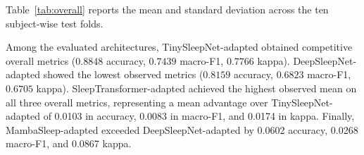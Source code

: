 \documentclass[conference]{IEEEtran}
\begin{document}
Table~\ref{tab:overall} reports the mean and standard deviation across the ten subject-wise test folds.

\begin{table}[H]
\centering
\caption{Architectures evaluated under the proposed unified framework.}
\label{tab:overall}
\setlength{\tabcolsep}{3.2pt}
\end{table}

Among the evaluated architectures, TinySleepNet-adapted obtained competitive overall metrics ($0.8848$ accuracy, $0.7439$ macro-F1, $0.7766$ kappa). DeepSleepNet-adapted showed the lowest observed metrics ($0.8159$ accuracy, $0.6823$ macro-F1, $0.6705$ kappa). SleepTransformer-adapted achieved the highest observed mean on all three overall metrics, representing a mean advantage over TinySleepNet-adapted of 0.0103 in accuracy, 0.0083 in macro-F1, and 0.0174 in kappa. Finally, MambaSleep-adapted exceeded DeepSleepNet-adapted by 0.0602 accuracy, 0.0268 macro-F1, and 0.0867 kappa.
\end{document}
